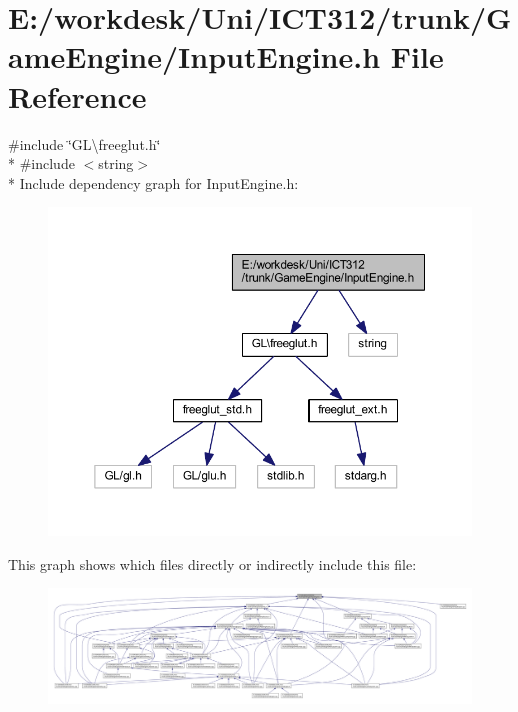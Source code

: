 \section{E\+:/workdesk/\+Uni/\+I\+C\+T312/trunk/\+Game\+Engine/\+Input\+Engine.h File Reference}
\label{_input_engine_8h}
{\ttfamily \#include \char`\"{}G\+L\textbackslash{}freeglut.\+h\char`\"{}}\\*
{\ttfamily \#include $<$string$>$}\\*
Include dependency graph for Input\+Engine.\+h\+:\nopagebreak
\begin{figure}[H]
\begin{center}
\leavevmode
\includegraphics[width=350pt]{da/d86/_input_engine_8h__incl}
\end{center}
\end{figure}
This graph shows which files directly or indirectly include this file\+:
\nopagebreak
\begin{figure}[H]
\begin{center}
\leavevmode
\includegraphics[width=350pt]{d4/d3d/_input_engine_8h__dep__incl}
\end{center}
\end{figure}
